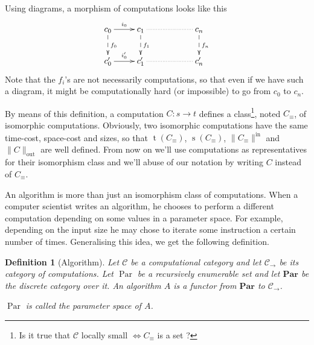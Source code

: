 \documentclass{article}
\newcommand{\cat}[1]{\mathscr{#1}}
\newcommand{\lcat}[1]{\mathbf{#1}}
\newcommand{\C}{\cat{C}}
\newcommand{\size}[1]{\lVert#1\rVert}
\newcommand{\sizein}[1]{\size{#1}^\mathrm{in}}
\newcommand{\sizeout}[1]{\size{#1}_\mathrm{out}}
\newcommand{\ra}{\rightarrow}
\DeclareMathOperator{\Time}{t}
\DeclareMathOperator{\Space}{s}
\DeclareMathOperator{\Par}{Par}
\newtheorem{definition}{Definition}
\begin{document}
  Using diagrams, a morphism of computations looks like this
  \[\xymatrix{
    c_0 \ar[r]^{i_0} \ar@{-->}[d]^{f_0} & c_1 \ar@{-->}[d]^{f_1} \ar@{.}[rr] && c_n\ar@{-->}[d]^{f_n}\\
    c_0' \ar[r]^{i_0'} & c_1' \ar@{.}[rr] && c_n'
  }\]
  Note that the $f_i$'s are not necessarily computations, so that even
  if we have such a diagram, it might be computationally hard (or
  impossible) to go from $c_0$ to $c_n$.
  
  By means of this definition, a computation $C:s\ra t$ defines a
  class\footnote{Is it true that $\C$ locally small $\Leftrightarrow
    C_\equiv$ is a set ?}, noted $C_\equiv$, of isomorphic
  computations. Obviously, two isomorphic computations have the same
  time-cost, space-cost and sizes, so that $\Time(C_\equiv)$,
  $\Space(C_\equiv)$, $\sizein{C_\equiv}$ and $\sizeout{C}$ are well
  defined. From now on we'll use computations as representatives for
  their isomorphism class and we'll abuse of our notation by writing
  $C$ instead of $C_\equiv$.
  
  


  An algorithm is more than just an isomorphism class of
  computations. When a computer scientist writes an algorithm, he
  chooses to perform a different computation depending on some values
  in a parameter space. For example, depending on the input size he
  may chose to iterate some instruction a certain number of
  times. Generalising this idea, we get the following definition.

  \begin{definition}[Algorithm]
    Let $\C$ be a computational category and let $\C_\ra$ be its
    category of computations. Let $\Par$ be a recursively
    enumerable set and let $\lcat{Par}$ be the discrete category over
    it. An \emph{algorithm} $A$ is a functor from $\lcat{Par}$ to
    $\C_\ra$.

    $\Par$ is called the parameter space of $A$.
  \end{definition}
\end{document}
